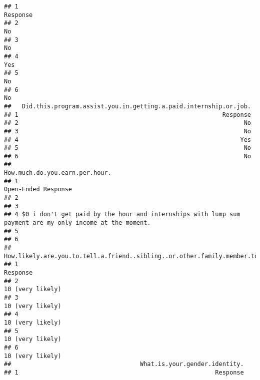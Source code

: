 \documentclass[
]{article}
\begin{document}
\begin{verbatim}
## 1                                                                                  Response
## 2                                                                                        No
## 3                                                                                        No
## 4                                                                                       Yes
## 5                                                                                        No
## 6                                                                                        No
##   Did.this.program.assist.you.in.getting.a.paid.internship.or.job.
## 1                                                         Response
## 2                                                               No
## 3                                                               No
## 4                                                              Yes
## 5                                                               No
## 6                                                               No
##                                                                            How.much.do.you.earn.per.hour.
## 1                                                                                     Open-Ended Response
## 2                                                                                                        
## 3                                                                                                        
## 4 $0 i don't get paid by the hour and internships with lump sum payment are my only income at the moment.
## 5                                                                                                        
## 6                                                                                                        
##   How.likely.are.you.to.tell.a.friend..sibling..or.other.family.member.to.join.this.program.
## 1                                                                                   Response
## 2                                                                           10 (very likely)
## 3                                                                           10 (very likely)
## 4                                                                           10 (very likely)
## 5                                                                           10 (very likely)
## 6                                                                           10 (very likely)
##                                    What.is.your.gender.identity.
## 1                                                       Response

\end{verbatim}
\end{document}
